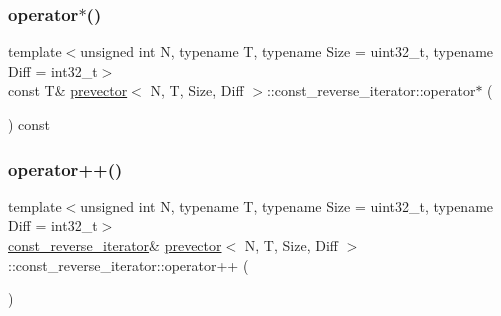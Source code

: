 \mbox{\label{classprevector_1_1const__reverse__iterator_a1bb2c8ee18fc05421f6fa6d1026d4555}} 
\subsubsection{\texorpdfstring{operator$\ast$()}{operator*()}}
{\footnotesize\ttfamily template$<$unsigned int N, typename T, typename Size = uint32\+\_\+t, typename Diff = int32\+\_\+t$>$ \\
const T\& \mbox{\hyperlink{classprevector}{prevector}}$<$ N, T, Size, Diff $>$\+::const\+\_\+reverse\+\_\+iterator\+::operator$\ast$ (\begin{DoxyParamCaption}{ }\end{DoxyParamCaption}) const\hspace{0.3cm}{\ttfamily [inline]}}

\mbox{\label{classprevector_1_1const__reverse__iterator_a0743ad35bd5713098bb17f082e8e8b3d}} 
\subsubsection{\texorpdfstring{operator++()}{operator++()}\hspace{0.1cm}{\footnotesize\ttfamily [1/2]}}
{\footnotesize\ttfamily template$<$unsigned int N, typename T, typename Size = uint32\+\_\+t, typename Diff = int32\+\_\+t$>$ \\
\mbox{\hyperlink{classprevector_1_1const__reverse__iterator}{const\+\_\+reverse\+\_\+iterator}}\& \mbox{\hyperlink{classprevector}{prevector}}$<$ N, T, Size, Diff $>$\+::const\+\_\+reverse\+\_\+iterator\+::operator++ (\begin{DoxyParamCaption}{ }\end{DoxyParamCaption})\hspace{0.3cm}{\ttfamily [inline]}}

